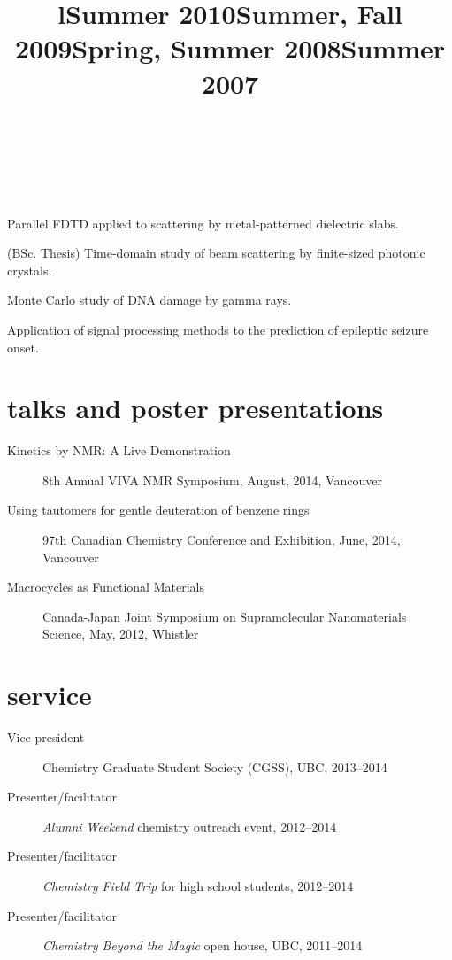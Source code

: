 \documentclass[overlapped,line,10pt,letterpaper]{res}
\begin{document}
\begin{resume}
\begin{format}
\title{l}\\
\\
\body\\
\end{format}
\title{\bfseries Summer 2010}
\dates{}
\begin{position}
Parallel FDTD applied to scattering by metal-patterned dielectric slabs.
\end{position}
\title{\bfseries Summer, Fall 2009}
\dates{}
\begin{position}
(BSc. Thesis) Time-domain study of beam scattering by finite-sized photonic crystals. 
\end{position}
\title{\bfseries Spring, Summer 2008}
\dates{}
\begin{position}
Monte Carlo study of DNA damage by gamma rays.
\end{position}
\title{\bfseries Summer 2007}
\dates{}
\begin{position}
Application of signal processing methods to the prediction of epileptic seizure onset.
\end{position}

\section{talks and poster presentations}
\begin{description}
\item[Kinetics by NMR: A Live Demonstration] 8th Annual VIVA NMR Symposium, August, 2014, Vancouver
\item[Using tautomers for gentle deuteration of benzene rings] 97th Canadian Chemistry Conference and Exhibition, June, 2014, Vancouver
\item[Macrocycles as Functional Materials] Canada-Japan Joint Symposium on Supramolecular Nanomaterials Science, May, 2012, Whistler
\end{description}

\section{service}
\begin{description}
\item[Vice president] Chemistry Graduate Student Society (CGSS), UBC, 2013–2014
\item[Presenter/facilitator] \emph{Alumni Weekend} chemistry outreach event, 2012–2014
\item[Presenter/facilitator] \emph{Chemistry Field Trip} for high school students, 2012–2014
\item[Presenter/facilitator] \emph{Chemistry Beyond the Magic} open house, UBC, 2011–2014
\end{description}


\end{resume}
\end{document}
